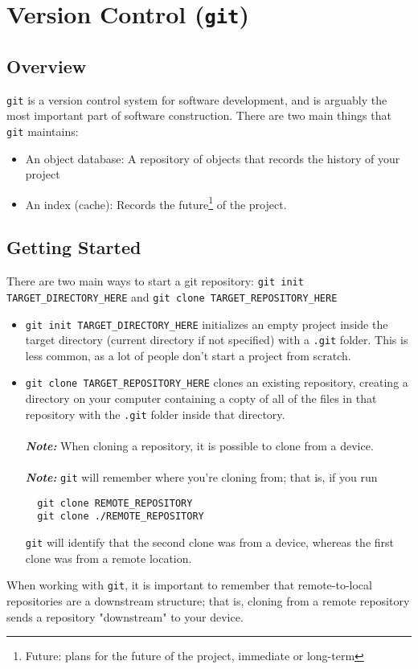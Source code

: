 \documentclass[13pt]{article}
\begin{document}
\section{Version Control (\texttt{git})}
\subsection{Overview}
\texttt{git} is a version control system for software development, and is arguably the most important part of software construction. There are two main things that \texttt{git} maintains:
\begin{itemize}[label=,leftmargin=*]
\item An object database: A repository of objects that records the history of your project
\item An index (cache): Records the future\footnote{Future: plans for the future of the project, immediate or long-term} of the project.
\end{itemize}





\subsection{Getting Started}
There are two main ways to start a git repository: \texttt{git init TARGET\_DIRECTORY\_HERE} and \texttt{git clone TARGET\_REPOSITORY\_HERE}

\begin{itemize} [label=,leftmargin=*]
\item \texttt{git init TARGET\_DIRECTORY\_HERE} initializes an empty project inside the target directory (current directory if not specified) with a \texttt{.git} folder. This is less common, as a lot of people don't start a project from scratch.
\item \texttt{git clone TARGET\_REPOSITORY\_HERE} clones an existing repository, creating a directory on your computer containing a copty of all of the files in that repository with the \texttt{.git} folder inside that directory. \\ \\
  \textbf{\textit{Note:}} When cloning a repository, it is possible to clone from a device. \\ \\
  \textbf{\textit{Note:}} \texttt{git} will remember where you're cloning from; that is, if you run
\begin{verbatim}
  git clone REMOTE_REPOSITORY
  git clone ./REMOTE_REPOSITORY \end{verbatim}
\texttt{git} will identify that the second clone was from a device, whereas the first clone was from a remote location.
\end{itemize}
When working with \texttt{git}, it is important to remember that remote-to-local repositories are a downstream structure; that is, cloning from a remote repository sends a repository "downstream" to your device.
\end{document}
